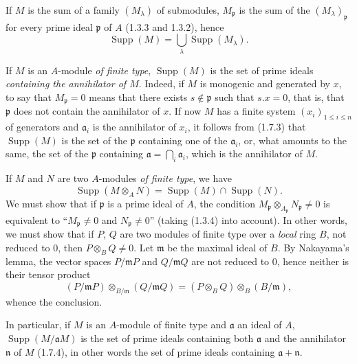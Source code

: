 \begin{env}[1.7.3]
\label{0.1.7.3}
If $M$ is the sum of a family $(M_\lambda)$ of submodules,
$M_{\mathfrak p}$ is the sum of the $(M_\lambda)_{\mathfrak p}$ for every prime
ideal $\mathfrak p$ of $A$ (1.3.3 and 1.3.2), hence
\[
  \operatorname{Supp}(M)=\bigcup_\lambda\operatorname{Supp}(M_\lambda).
\]
\end{env}

\begin{env}[1.7.4]
\label{0.1.7.4}
If $M$ is an $A$-module \emph{of finite type}, $\operatorname{Supp}(M)$ is
the set of prime ideals \emph{containing the annihilator of $M$}. Indeed,
if $M$ is monogenic and generated by $x$, to say that $M_{\mathfrak p}=0$ means
that there exists $s\notin\mathfrak p$ such that $s.x=0$, that is, that $\mathfrak p$ does not
contain the annihilator of $x$. If now $M$ has a finite system
$(x_i)_{1\leq i\leq n}$ of generators and $\mathfrak a_i$ is the annihilator
of $x_i$, it follows from (1.7.3) that $\operatorname{Supp}(M)$ is the set of
the $\mathfrak p$ containing one of the $\mathfrak a_i$, or, what amounts to the same,
the set of the $\mathfrak p$ containing $\mathfrak a=\bigcap_i\mathfrak a_i$,
which is the annihilator of $M$.
\end{env}

\begin{env}[1.7.5]
\label{0.1.7.5}
If $M$ and $N$ are two $A$-modules \emph{of finite type}, we have
\[
  \operatorname{Supp}(M\otimes_A N)
  =\operatorname{Supp}(M)\cap\operatorname{Supp}(N).
\]
We must show that if $\mathfrak p$ is a prime ideal of $A$, the
condition $M_{\mathfrak p}\otimes_{A_{\mathfrak p}}N_{\mathfrak p}\neq0$ is
equivalent to ``$M_{\mathfrak p}\neq0$ and $N_{\mathfrak p}\neq0$'' (taking
(1.3.4) into account). In other words, we must show that if $P$, $Q$ are two
modules of finite type over a \emph{local} ring $B$, not reduced to $0$, then
$P\otimes_B Q\neq0$. Let $\mathfrak m$ be the maximal ideal of $B$. By
Nakayama's lemma, the vector spaces $P/\mathfrak mP$ and
$Q/\mathfrak mQ$ are not reduced to $0$, hence neither is their
tensor product
\[
  (P/\mathfrak mP)\otimes_{B/\mathfrak m}(Q/\mathfrak mQ)
  =(P\otimes_B Q)\otimes_B(B/\mathfrak m),
\]
whence the conclusion.

In particular, if $M$ is an $A$-module of finite type and $\mathfrak a$ an ideal
of $A$, $\operatorname{Supp}(M/\mathfrak aM)$ is the set of prime
ideals containing both $\mathfrak a$ and the annihilator $\mathfrak n$ of
$M$ (1.7.4), in other words the set of prime ideals containing
$\mathfrak a+\mathfrak n$.
\end{env}


